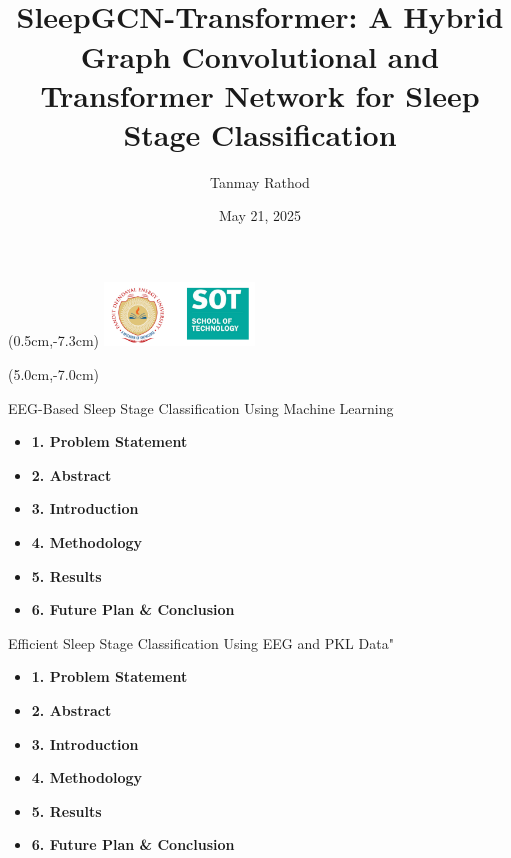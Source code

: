 \documentclass [aspectratio=169]{beamer}
\title[]{\vspace{60pt} \\
SleepGCN-Transformer: A Hybrid Graph Convolutional and Transformer Network for Sleep Stage Classification} %
\author[]{Tanmay Rathod }
\date{May 21, 2025}
\begin{document}
{
\begin{frame}
    \titlepage
    \begin{textblock*}{4cm}(0.5cm,-7.3cm)
        \includegraphics[width=4cm]{figures/pdpu logo-.png}
    \end{textblock*}
    \begin{textblock*}{8cm}(5.0cm,-7.0cm)
        \huge {} %
    \end{textblock*}
\end{frame}
}



\begin{frame}{EEG-Based Sleep Stage Classification Using Machine Learning}
	
	\begin{block}{}
		\begin{itemize}
			\item \textbf{1. Problem Statement}
			\item \textbf{2. Abstract}
			\item \textbf{3. Introduction}
			\item \textbf{4. Methodology}
			\item \textbf{5. Results}
			\item \textbf{6. Future Plan \& Conclusion}
		\end{itemize}
	\end{block}
\end{frame}












\begin{frame}{Efficient Sleep Stage Classification Using EEG and PKL Data"}
	
	\begin{block}{}
		\begin{itemize}
			\item \textbf{1. Problem Statement}
			\item \textbf{2. Abstract}
			\item \textbf{3. Introduction}
			\item \textbf{4. Methodology}
			\item \textbf{5. Results}
			\item \textbf{6. Future Plan \& Conclusion}
		\end{itemize}
	\end{block}
\end{frame}
\end{document}
